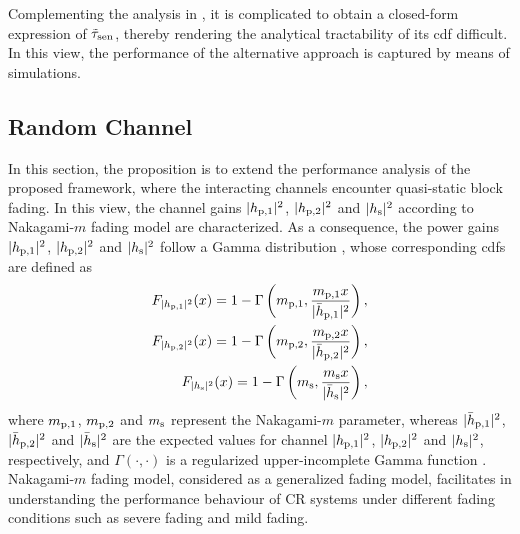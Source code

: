 \begin{remark} \label{rm:rem2} 
\normalfont
Complementing the analysis in \cite{Liang08}, it is complicated to obtain a closed-form expression of $\tilde{\tau}_{\text{sen}}$, thereby rendering the analytical tractability of its cdf difficult. In this view, the performance of the alternative approach is captured by means of simulations.
\end{remark} 

\subsection{Random Channel} \label{ssec:ran_th}
In this section, the proposition is to extend the performance analysis of the proposed framework, where the interacting channels encounter quasi-static block fading. In this view, the channel gains $|h_{\text{p,1}}|^2$, $|h_{\text{p,2}}|^2$ and $|h_{\text{s}}|^2$ according to Nakagami-$m$ fading model are characterized. As a consequence, the power gains $|h_{\text{p,1}}|^2$, $|h_{\text{p,2}}|^2$ and $|h_{\text{s}}|^2$ follow a Gamma distribution \cite{Goldsmith05}, whose corresponding cdfs are defined as
\begin{align}
F_{|h_{\text{p,1}}|^2}(x) = 1 - \Gamma\left(m_{\text{p,1}}, \frac{m_{\text{p,1}} x}{|\bar{h}_{\text{p,1}}|^2}\right), \label{eq_IS:dis_phpo}\\
F_{|h_{\text{p,2}}|^2}(x) = 1 - \Gamma\left(m_{\text{p,2}}, \frac{m_{\text{p,2}} x}{|\bar{h}_{\text{p,2}}|^2}\right), \label{eq_IS:dis_pght}\\  
F_{|h_{\text{s}}|^2}(x) = 1 - \Gamma\left(m_{\text{s}} , \frac{m_{\text{s}} x}{|\bar{h}_{\text{s}}|^2}\right), \label{eq_IS:dis_phs}
\end{align}
where $m_{\text{p,1}}$, $m_{\text{p,2}}$ and $m_{\text{s}}$ represent the Nakagami-$m$ parameter, whereas $|\bar{h}_{\text{p,1}}|^2$, $|\bar{h}_{\text{p,2}}|^2$ and $|\bar{h}_{\text{s}}|^2$ are the expected values for channel $|h_{\text{p,1}}|^2$, $|h_{\text{p,2}}|^2$ and $|h_{\text{s}}|^2$, respectively, and $\Gamma(\cdot, \cdot)$ is a regularized upper-incomplete Gamma function \cite{abramo}. Nakagami-$m$ fading model, considered as a generalized fading model, facilitates in understanding the performance behaviour of CR systems under different fading conditions such as severe fading and mild fading. 

